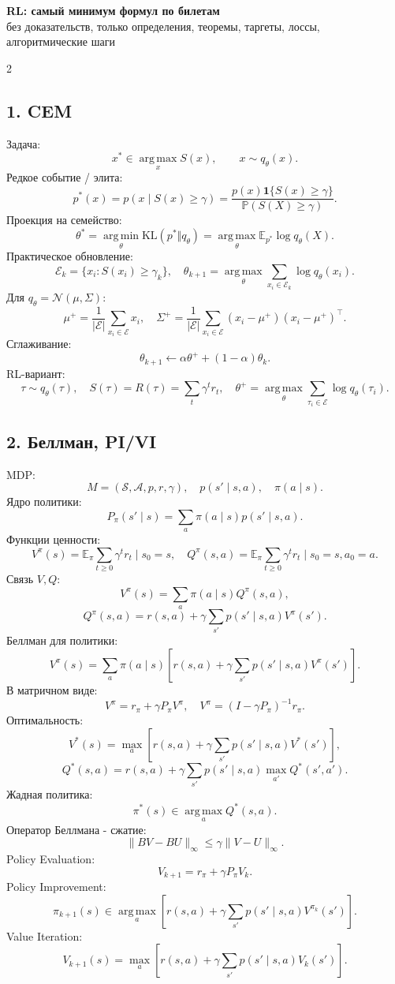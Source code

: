 \documentclass[8pt,a4paper]{extarticle}
\newcommand{\E}{\mathbb E}
\renewcommand{\Prob}{\mathbb P}
\newcommand{\KL}{\mathrm{KL}}
\newcommand{\argmax}{\operatorname*{arg\,max}}
\newcommand{\argmin}{\operatorname*{arg\,min}}
\newcommand{\cS}{\mathcal S}
\newcommand{\cA}{\mathcal A}
\newcommand{\cE}{\mathcal E}
\newcommand{\1}{\mathbf 1}
\begin{document}
\begin{center}
{\Large \textbf{RL: самый минимум формул по билетам}}\\[-1mm]
{\small без доказательств, только определения, теоремы, таргеты, лоссы, алгоритмические шаги}
\end{center}
\vspace{-2mm}
\begin{multicols*}{2}
\footnotesize

\subsection*{1. CEM}
Задача:
\[
x^*\in\argmax_x S(x),\qquad x\sim q_\theta(x).
\]
Редкое событие / элита:
\[
p^*(x)=p(x\mid S(x)\ge\gamma)=\frac{p(x)\1\{S(x)\ge\gamma\}}{\Prob(S(X)\ge\gamma)}.
\]
Проекция на семейство:
\[
\theta^*=\argmin_\theta \KL(p^*\Vert q_\theta)
=\argmax_\theta \E_{p^*}\log q_\theta(X).
\]
Практическое обновление:
\[
\cE_k=\{x_i:S(x_i)\ge\gamma_k\},\quad
\theta_{k+1}=\argmax_\theta\sum_{x_i\in\cE_k}\log q_\theta(x_i).
\]
Для $q_\theta=\mathcal N(\mu,\Sigma)$:
\[
\mu^+=\frac1{|\cE|}\sum_{x_i\in\cE}x_i,
\quad
\Sigma^+=\frac1{|\cE|}\sum_{x_i\in\cE}(x_i-\mu^+)(x_i-\mu^+)^\top.
\]
Сглаживание:
\[
\theta_{k+1}\leftarrow \alpha\theta^+ +(1-\alpha)\theta_k.
\]
RL-вариант:
\[
\tau\sim q_\theta(\tau),\quad S(\tau)=R(\tau)=\sum_t\gamma^t r_t,
\quad \theta^+=\argmax_\theta\sum_{\tau_i\in\cE}\log q_\theta(\tau_i).
\]

\subsection*{2. Беллман, PI/VI}
MDP:
\[
M=(\cS,\cA,p,r,\gamma),\quad p(s'\mid s,a),\quad \pi(a\mid s).
\]
Ядро политики:
\[
P_\pi(s'\mid s)=\sum_a\pi(a\mid s)p(s'\mid s,a).
\]
Функции ценности:
\[
V^\pi(s)=\E_\pi\sum_{t\ge0}\gamma^t r_t\mid s_0=s,
\quad
Q^\pi(s,a)=\E_\pi\sum_{t\ge0}\gamma^t r_t\mid s_0=s,a_0=a.
\]
Связь $V,Q$:
\[
V^\pi(s)=\sum_a\pi(a\mid s)Q^\pi(s,a),
\]
\[
Q^\pi(s,a)=r(s,a)+\gamma\sum_{s'}p(s'\mid s,a)V^\pi(s').
\]
Беллман для политики:
\[
V^\pi(s)=\sum_a\pi(a\mid s)\left[r(s,a)+\gamma\sum_{s'}p(s'\mid s,a)V^\pi(s')\right].
\]
В матричном виде:
\[
V^\pi=r_\pi+\gamma P_\pi V^\pi,
\quad
V^\pi=(I-\gamma P_\pi)^{-1}r_\pi.
\]
Оптимальность:
\[
V^*(s)=\max_a\left[r(s,a)+\gamma\sum_{s'}p(s'\mid s,a)V^*(s')\right],
\]
\[
Q^*(s,a)=r(s,a)+\gamma\sum_{s'}p(s'\mid s,a)\max_{a'}Q^*(s',a').
\]
Жадная политика:
\[
\pi^*(s)\in\argmax_a Q^*(s,a).
\]
Оператор Беллмана - сжатие:
\[
\|BV-BU\|_\infty\le \gamma\|V-U\|_\infty.
\]
Policy Evaluation:
\[
V_{k+1}=r_\pi+\gamma P_\pi V_k.
\]
Policy Improvement:
\[
\pi_{k+1}(s)\in\argmax_a\left[r(s,a)+\gamma\sum_{s'}p(s'\mid s,a)V^{\pi_k}(s')\right].
\]
Value Iteration:
\[
V_{k+1}(s)=\max_a\left[r(s,a)+\gamma\sum_{s'}p(s'\mid s,a)V_k(s')\right].
\]


\end{multicols*}
\end{document}
